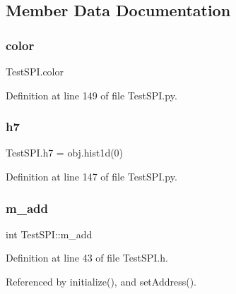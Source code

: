 \subsection{Member Data Documentation}
\mbox{\label{classTestSPI_aace1197ad912510316ec3d9dad79ebf6}} 
\subsubsection{\texorpdfstring{color}{color}}
{\footnotesize\ttfamily Test\+S\+P\+I.\+color}



Definition at line 149 of file Test\+S\+P\+I.\+py.

\mbox{\label{classTestSPI_aa072fcb2c8a99033ff634a04ac375ac7}} 
\subsubsection{\texorpdfstring{h7}{h7}}
{\footnotesize\ttfamily Test\+S\+P\+I.\+h7 = obj.\+hist1d(0)}



Definition at line 147 of file Test\+S\+P\+I.\+py.

\mbox{\label{classTestSPI_aa30affe50de58083b1dcca878903b0a7}} 
\subsubsection{\texorpdfstring{m\+\_\+add}{m\_add}}
{\footnotesize\ttfamily int Test\+S\+P\+I\+::m\+\_\+add\hspace{0.3cm}{\ttfamily [private]}}



Definition at line 43 of file Test\+S\+P\+I.\+h.



Referenced by initialize(), and set\+Address().

\mbox{\label{classTestSPI_a2852d24b4449df4c3722c25c7d9e08d4}} 
